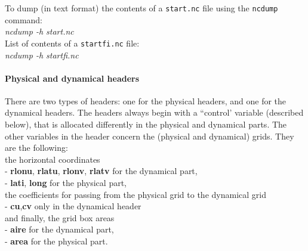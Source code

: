 To dump (in text format) the contents of a {\tt start.nc} file using the
{\tt ncdump} command:\\

\noindent
{\it ncdump -h start.nc}\\


\noindent
List of contents of a {\tt startfi.nc} file:\\

\noindent
{\it ncdump -h startfi.nc}\\





\paragraph{Physical and dynamical headers}

There are two types of headers: one for the physical headers,
and one for the dynamical headers.
The headers always begin with a ``control' variable
(described below), that is allocated differently in the physical and
dynamical parts.
The other variables in the header concern the (physical and dynamical) grids.
They are the following:\\

\noindent
the horizontal coordinates\\
- {\bf rlonu}, {\bf rlatu}, {\bf rlonv}, {\bf rlatv} for the dynamical part,\\
- {\bf lati}, {\bf long} for the physical part,\\

\noindent
the coefficients for passing from the physical grid to the dynamical grid\\
- {\bf cu},{\bf cv} only in the dynamical header\\

\noindent
and finally, the grid box areas\\
- {\bf aire} for the dynamical part,\\
- {\bf area} for the physical part.\\

